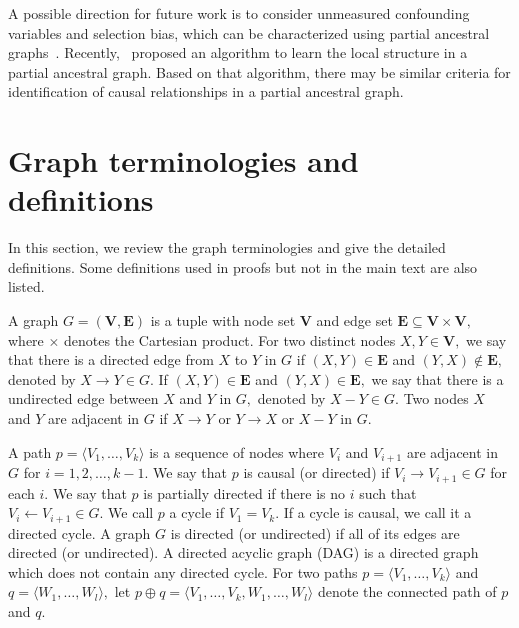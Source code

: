 \documentclass{article}
\begin{document}
A possible direction for future work is to consider unmeasured confounding variables and selection bias, which can be characterized using partial ancestral graphs~\citep{richardson2003causal, zhang2008completeness}. Recently,~\citet{xie2024local} proposed an algorithm to learn the local structure in a partial ancestral graph. Based on that algorithm, there may be similar criteria for identification of causal relationships in a partial ancestral graph.




\appendix

\section{Graph terminologies and definitions}
\label{append:graph}
In this section, we review the graph terminologies and give the detailed definitions. Some definitions used in proofs but not in the main text are also listed.

A graph $G=(\mathbf{V},\mathbf{E})$ is a tuple with node set $\mathbf{V}$ and edge set $\mathbf{E}\subseteq \mathbf{V}\times \mathbf{V},$ where $\times$ denotes the Cartesian product. For two distinct nodes $X,Y\in \mathbf{V},$ we say that there is a directed edge from $X$ to $Y$ in $G$ if $(X,Y)\in \mathbf{E}$ and $(Y,X)\not\in \mathbf{E},$ denoted by $X\to Y\in G.$ If $(X,Y)\in \mathbf{E}$ and $(Y,X)\in \mathbf{E},$ we say that there is a undirected edge between $X$ and $Y$ in $G,$ denoted by $X-Y\in G.$ Two nodes $X$ and $Y$ are adjacent in $G$ if $X\to Y$ or $Y\to X$ or $X-Y$ in $G.$ 

A path $p=\langle V_1,\dots,V_k \rangle$ is a sequence of nodes where $V_i$ and $V_{i+1}$ are adjacent in $G$ for $i=1,2,\dots,k-1.$ We say that $p$ is causal (or directed) if $V_i\to V_{i+1}\in G$ for each $i.$ We say that $p$ is partially directed if there is no $i$ such that $V_i\leftarrow V_{i+1}\in G.$
We call $p$ a cycle if $V_1=V_k.$ If a cycle is causal, we call it a directed cycle. A graph $G$ is directed (or undirected) if all of its edges are directed (or undirected). A directed acyclic graph (DAG) is a directed graph which does not contain any directed cycle. 
For two paths $p=\langle V_1,\dots,V_k \rangle$ and $q=\langle W_1,\dots,W_l\rangle,$ let $p\oplus q=\langle V_1,\dots,V_k,W_1,\dots,W_l\rangle$ denote the connected path of $p$ and $q.$
\end{document}
